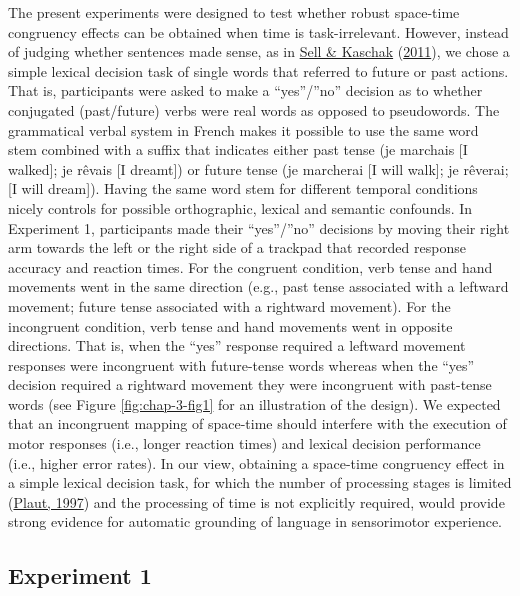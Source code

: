\documentclass[
  a4paper,12pt,twoside,onecolumn,openright,final,oldfontcommands]{memoir}
\begin{document}
The present experiments were designed to test whether robust space-time congruency effects can be obtained when time is task-irrelevant. However, instead of judging whether sentences made sense, as in \protect\hyperlink{ref-sell_processing_2011}{Sell \& Kaschak} (\protect\hyperlink{ref-sell_processing_2011}{2011}), we chose a simple lexical decision task of single words that referred to future or past actions. That is, participants were asked to make a ``yes''/''no'' decision as to whether conjugated (past/future) verbs were real words as opposed to pseudowords. The grammatical verbal system in French makes it possible to use the same word stem combined with a suffix that indicates either past tense (je marchais {[}I walked{]}; je rêvais {[}I dreamt{]}) or future tense (je marcherai {[}I will walk{]}; je rêverai; {[}I will dream{]}). Having the same word stem for different temporal conditions nicely controls for possible orthographic, lexical and semantic confounds. In Experiment 1, participants made their ``yes''/''no'' decisions by moving their right arm towards the left or the right side of a trackpad that recorded response accuracy and reaction times. For the congruent condition, verb tense and hand movements went in the same direction (e.g., past tense associated with a leftward movement; future tense associated with a rightward movement). For the incongruent condition, verb tense and hand movements went in opposite directions. That is, when the ``yes'' response required a leftward movement responses were incongruent with future-tense words whereas when the ``yes'' decision required a rightward movement they were incongruent with past-tense words (see Figure \ref{fig:chap-3-fig1} for an illustration of the design). We expected that an incongruent mapping of space-time should interfere with the execution of motor responses (i.e., longer reaction times) and lexical decision performance (i.e., higher error rates). In our view, obtaining a space-time congruency effect in a simple lexical decision task, for which the number of processing stages is limited (\protect\hyperlink{ref-plaut_structure_1997}{Plaut, 1997}) and the processing of time is not explicitly required, would provide strong evidence for automatic grounding of language in sensorimotor experience.

\hypertarget{experiment-1}{%
\subsection{Experiment 1}\label{experiment-1}}
\end{document}
